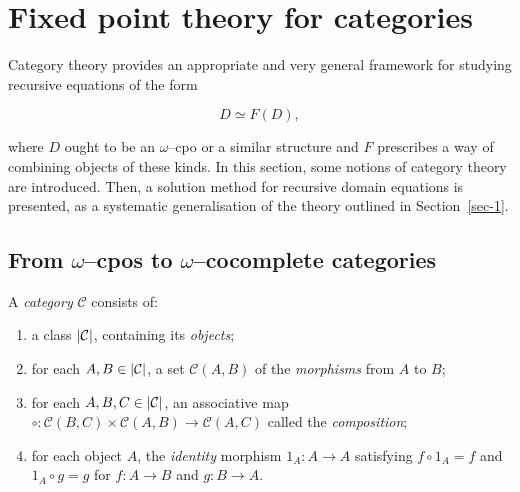\section{Fixed point theory for categories}\label{sec-2}

Category theory provides an appropriate and very general framework for studying recursive equations of the form

\begin{equation*}
  D \simeq F(D),
\end{equation*}

where \(D\) ought to be an \(\omega{}\)--cpo or a similar structure and \(F\) prescribes a way of combining objects of these kinds.
In this section, some notions of category theory are introduced. Then, a solution method for recursive domain equations is presented, as a systematic generalisation of the theory outlined in Section~\ref{sec-1}.

\subsection{From \(\omega\)--cpos to \(\omega\)--cocomplete categories}%

\begin{dfn}
  A \emph{category} \(\mathcal{C}\) consists of:
  \begin{enumerate}
    \item a class \(\lvert \mathcal{C} \rvert\), containing its \emph{objects};
    \item for each \(A, B \in \lvert \mathcal{C} \rvert\), a set \(\mathcal{C}(A,B)\) of the \emph{morphisms} from \(A\) to \(B\);
    \item for each \(A,B,C \in \lvert \mathcal{C} \rvert\), an associative map
    \(
      \circ \colon \mathcal{C}(B,C) \times \mathcal{C}(A,B) \to \mathcal{C}(A,C)
    \)
    called the \emph{composition};
    \item for each object \(A\), the \emph{identity} morphism \(1_A \colon A \to A\) satisfying \(f \circ 1_A = f\) and \(1_A \circ g = g\) for \(f \colon A \to B\) and \(g \colon B \to A\).
  \end{enumerate}
  \begin{center}
  \end{center}
\end{dfn}

